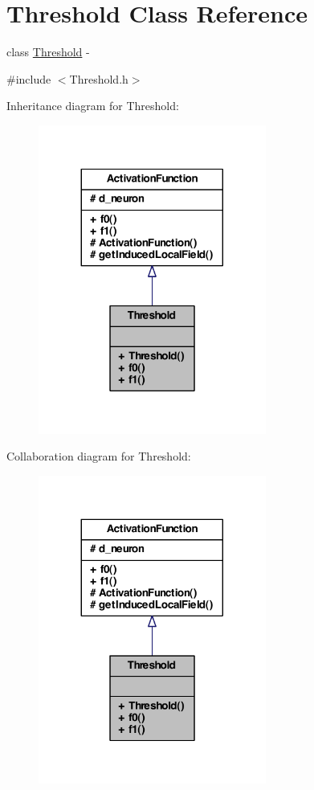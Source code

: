 \hypertarget{class_threshold}{
\section{Threshold Class Reference}
\label{class_threshold}
}


class \hyperlink{class_threshold}{Threshold} -\/  




{\ttfamily \#include $<$Threshold.h$>$}



Inheritance diagram for Threshold:
\nopagebreak
\begin{figure}[H]
\begin{center}
\leavevmode
\includegraphics[width=212pt]{class_threshold__inherit__graph}
\end{center}
\end{figure}


Collaboration diagram for Threshold:
\nopagebreak
\begin{figure}[H]
\begin{center}
\leavevmode
\includegraphics[width=212pt]{class_threshold__coll__graph}
\end{center}
\end{figure}
